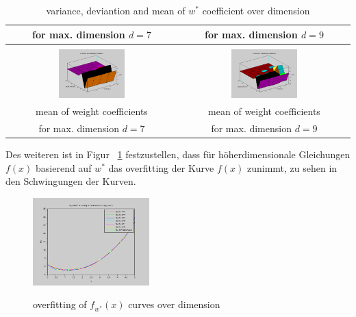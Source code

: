 \documentclass[]{report}
\begin{document}
\begin{table}[h]
\begin{tabular}{| c | c|}
for max. dimension $d=7$ & for max. dimension $d=9$ \\
\hline
\\
\includegraphics[width=0.4\textwidth]{./images/MeanWeightCoeffinientsOverDimension_stable.png} & \includegraphics[width=0.4\textwidth]{./images/MeanWeightCoeffinientsOverDimension.png} \\
mean of weight coefficients & mean of weight coefficients \\
for max. dimension $d=7$ & for max. dimension $d=9$ \\
\hline
\end{tabular}
\caption{variance, deviantion and mean of $w^*$ coefficient over dimension}
\label{tab:VarianceAndDeviantion}
\end{table}

Des weiteren ist in Figur ~\ref{fig:Overfitting} festzustellen, dass f\"ur h\"oherdimensionale Gleichungen $f(x)$ basierend auf $w^*$ das overfitting der Kurve $f(x)$ zunimmt, zu sehen in den Schwingungen der Kurven.

\begin{figure}[h]
\centering
\includegraphics[width=0.4\textwidth]{./images/f_x_w_star_overDimensions_stable.png} \\
\caption{overfitting of $f_{w^*}(x)$ curves over dimension}
\label{fig:Overfitting}
\end{figure}
\end{document}
